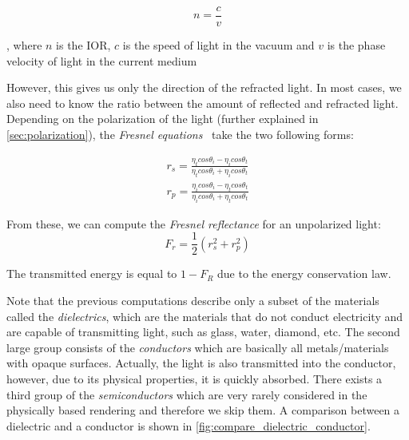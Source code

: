 \begin{equation}
n=\frac{c}{v}
\end{equation}

, where $n$ is the IOR, $c$ is the speed of light in the vacuum and $v$ is the phase velocity of light in the current medium

However, this gives us only the direction of the refracted light. In most cases, we also need to know the ratio between the amount of reflected and refracted light. Depending on the polarization of the light (further explained in \autoref{sec:polarization}), the \emph{Fresnel equations}~\cite{pharr2016physically} take the two following forms:

\begin{align*}
r_s = \frac{\eta_t cos\theta_i - \eta_i cos\theta_t}{\eta_t cos\theta_i + \eta_i cos\theta_t}\\
r_p = \frac{\eta_i cos\theta_i - \eta_t cos\theta_t}{\eta_i cos\theta_i + \eta_t cos\theta_t} 
\end{align*}

From these, we can compute the \emph{Fresnel reflectance} for an unpolarized light:
\begin{equation}
F_r=\frac{1}{2}(r_s^2 + r_p^2)
\end{equation}

The transmitted energy is equal to $1-F_R$ due to the energy conservation law.

Note that the previous computations describe only a subset of the materials called the \emph{dielectrics}, which are the materials that do not conduct electricity and are capable of transmitting light, such as glass, water, diamond, etc. The second large group consists of the \emph{conductors} which are basically all metals/materials with opaque surfaces. Actually, the light is also transmitted into the conductor, however, due to its physical properties, it is quickly absorbed. There exists a third group of the \emph{semiconductors} which are very rarely considered in the physically based rendering and therefore we skip them. A comparison between a dielectric and a conductor is shown in \autoref{fig:compare_dielectric_conductor}.

